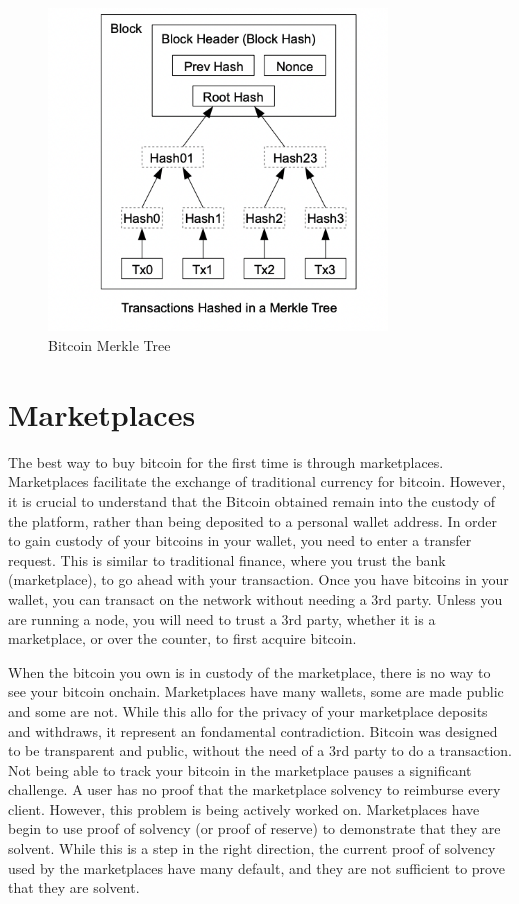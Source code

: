 \begin{figure}[ht!]
\centering
\includegraphics[width=90mm]{MerkleTree.png}
\caption{Bitcoin Merkle Tree \cite{N08}}
\label{overflow}
\end{figure}


\section{Marketplaces}
The best way to buy bitcoin for the first time is through marketplaces. Marketplaces facilitate the exchange of traditional currency for bitcoin.
However, it is crucial to understand that the Bitcoin obtained remain into the custody of the platform, rather than being deposited to a personal wallet address.
In order to gain custody of your bitcoins in your wallet, you need to enter a transfer request. This is similar to traditional finance, where you trust the bank (marketplace), to
go ahead with your transaction. Once you have bitcoins in your wallet, you can transact on the network without needing a 3rd party.
Unless you are running a node, you will need to trust a 3rd party, whether it is a marketplace, or over the counter, to first acquire bitcoin.

When the bitcoin you own is in custody of the marketplace, there is no way to see your bitcoin onchain. Marketplaces have many wallets, some are made public and some are not.
While this allo for the privacy of your marketplace deposits and withdraws, it represent an fondamental contradiction. Bitcoin was designed to be transparent and public, without the need of a 3rd party to do a transaction.
Not being able to track your bitcoin in the marketplace pauses a significant challenge. A user has no proof that the marketplace solvency to reimburse
every client. 
However, this problem is being actively worked on. Marketplaces have begin to use proof of solvency (or proof of reserve) to demonstrate that they are solvent.
While this is a step in the right direction, the current proof of solvency used by the marketplaces have many default, and they are not sufficient to prove that they are solvent.


